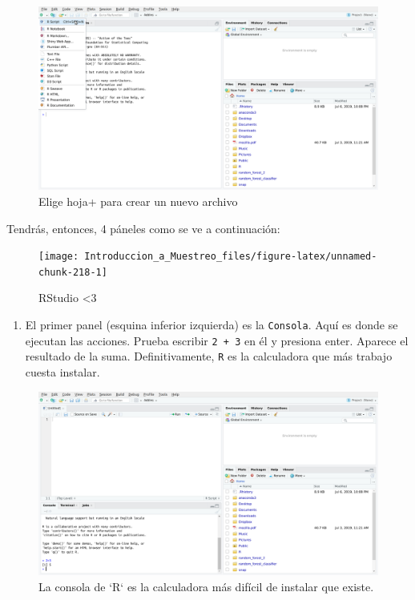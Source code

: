 \documentclass[
]{book}
\providecommand{\tightlist}{%
  \setlength{\itemsep}{0pt}\setlength{\parskip}{0pt}}
\begin{document}
\begin{figure}

{\centering \includegraphics[width=40in]{images/RStudio2} 

}

\caption{Elige hoja+ para crear un nuevo archivo}\label{fig:unnamed-chunk-217}
\end{figure}

Tendrás, entonces, 4 páneles como se ve a continuación:

\begin{figure}

{\centering \texttt{[image: Introduccion\_a\_Muestreo\_files/figure-latex/unnamed-chunk-218-1]} 

}

\caption{RStudio <3}\label{fig:unnamed-chunk-218}
\end{figure}

\begin{enumerate}
\def\labelenumi{\arabic{enumi}.}
\tightlist
\item
  El primer panel (esquina inferior izquierda) es la \texttt{Consola}. Aquí es donde se ejecutan las acciones. Prueba escribir \texttt{2\ +\ 3} en él y presiona enter. Aparece el resultado de la suma. Definitivamente, \texttt{R} es la calculadora que más trabajo cuesta instalar.
\end{enumerate}

\begin{figure}

{\centering \includegraphics[width=40in]{images/RStudio4} 

}

\caption{La consola de `R` es la calculadora más difícil de instalar que existe.}\label{fig:unnamed-chunk-219}
\end{figure}
\end{document}
